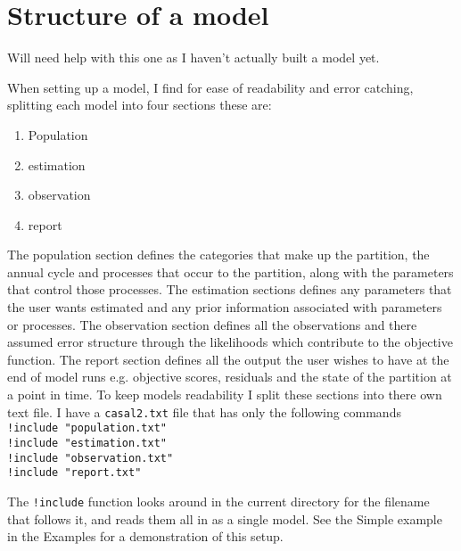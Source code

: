 \section{Structure of a model}\label{Sec:model}

Will need help with this one as I haven't actually built a model yet. 

When setting up a model, I find for ease of readability and error catching, splitting each model into four sections these are:

\begin{enumerate}
\item Population
\item estimation
\item observation
\item report
\end{enumerate}

The population section defines the categories that make up the partition, the annual cycle and processes that occur to the partition, along with the parameters that control those processes. The estimation sections defines any parameters that the user wants estimated and any prior information associated with parameters or processes. The observation section defines all the observations and there assumed error structure through the likelihoods which contribute to the objective function. The report section defines all the output the user wishes to have at the end of model runs e.g. objective scores, residuals and the state of the partition at a point in time. To keep models readability I split these sections into there own text file. I have a \texttt{casal2.txt} file that has only the following commands\\
\texttt{!include "population.txt"}\\
\texttt{!include "estimation.txt"}\\
\texttt{!include "observation.txt"}\\
\texttt{!include "report.txt"}

The \texttt{!include} function looks around in the current directory for the filename that follows it, and reads them all in as a single model. See the Simple example in the Examples for a demonstration of this setup.
